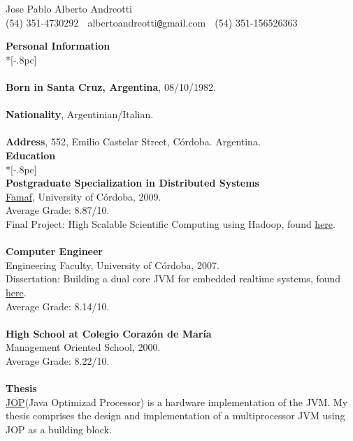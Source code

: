\documentclass[a4paper,11pt,english]{article}
\begin{document}
\begin{center}
{\Large Jose Pablo Alberto Andreotti} \\[.5pc]
(54) 351-4730292 $\;$ albertoandreotti\verb|@|gmail.com $\;$ (54) 351-156526363 \\[3pc]
\end{center}
{\large \bf Personal Information} \\*[-.8pc]
\underline{\hspace{6in}} \\
\\
{\bf Born in Santa Cruz, Argentina}, 08/10/1982.\\
\\
{\bf Nationality}, Argentinian/Italian.\\
\\
{\bf Address}, 552, Emilio Castelar Street, C\'ordoba. Argentina.\\

{\large \bf Education} \\*[-.8pc]
\underline{\hspace{6in}} \\
\newline
{\bf Postgraduate Specialization in Distributed Systems}\\
\href{http://www.famaf.unc.edu.ar/}{Famaf}, University of C\'ordoba, 2009. \\
Average Grade: 8.87/10. \\
Final Project: High Scalable Scientific Computing using Hadoop, found \href{https://docs.google.com/viewer?a=v&pid=explorer&chrome=true&srcid=0B5AOpwg8IzVANjJlODZhZDctNWUzMS00MmNhLWI3OWMtMWNhMTdjODQwNjVl&hl=en}{here}.\\
\\
{\bf Computer Engineer}\\
Engineering Faculty, University of C\'ordoba, 2007.\\
Dissertation: Building a dual core JVM for embedded realtime systems, found \href{https://docs.google.com/viewer?a=v&pid=explorer&chrome=true&srcid=1gdJXYgQtLDHDOxGDtbKzdmAl1LmNx-yo4w6vNl-K_Z-1YocLhtJxMvoqGvd1&hl=en}{here}.\\
Average Grade: 8.14/10. \\
\\
{\bf High School at Colegio Coraz\'on de Mar\'ia}\\
Management Oriented School, 2000.\\
Average Grade: 8.22/10.\\
\\
{\bf Thesis} \\
\href{http://www.jopdesign.com}{JOP}(Java Optimizad Processor) is a hardware implementation of the JVM. My thesis 
comprises the design and implementation of a multiprocessor JVM using JOP as a building block.\\
\end{document}
